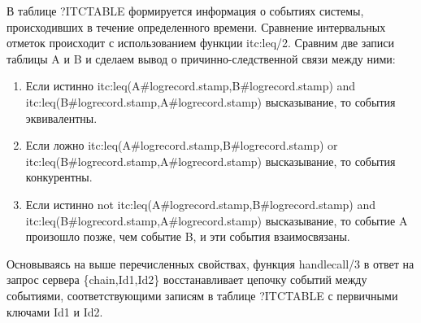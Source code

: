 {В таблице ?ITC\underline{\hspace{0.25cm}}TABLE формируется информация о событиях системы, происходивших в течение определенного времени. Сравнение интервальных отметок происходит с использованием функции itc:leq/2. Сравним две записи таблицы A и B и сделаем вывод о причинно-следственной связи между ними:
\begin{enumerate}
\item Если истинно itc:leq(A\#log\underline{\hspace{0.25cm}}record.stamp,B\#log\underline{\hspace{0.25cm}}record.stamp) and itc:leq(B\#log\underline{\hspace{0.25cm}}record.stamp,A\#log\underline{\hspace{0.25cm}}record.stamp) высказывание, то события эквивалентны.
\item Если ложно itc:leq(A\#log\underline{\hspace{0.25cm}}record.stamp,B\#log\underline{\hspace{0.25cm}}record.stamp) or itc:leq(B\#log\underline{\hspace{0.25cm}}record.stamp,A\#log\underline{\hspace{0.25cm}}record.stamp) высказывание, то события конкурентны.
\item Если истинно not itc:leq(A\#log\underline{\hspace{0.25cm}}record.stamp,B\#log\underline{\hspace{0.25cm}}record.stamp) and itc:leq(B\#log\underline{\hspace{0.25cm}}record.stamp,A\#log\underline{\hspace{0.25cm}}record.stamp) высказывание, то событие A произошло позже, чем событие B, и эти события взаимосвязаны. 
\end{enumerate}

Основываясь на выше перечисленных свойствах, функция handle\underline{\hspace{0.25cm}}call/3 в ответ на запрос сервера \{chain,Id\underline{\hspace{0.25cm}}1,Id\underline{\hspace{0.25cm}}2\} восстанавливает цепочку событий между событиями, соответствующими записям в таблице ?ITC\underline{\hspace{0.25cm}}TABLE с первичными ключами Id\underline{\hspace{0.25cm}}1 и Id\underline{\hspace{0.25cm}}2.
}
